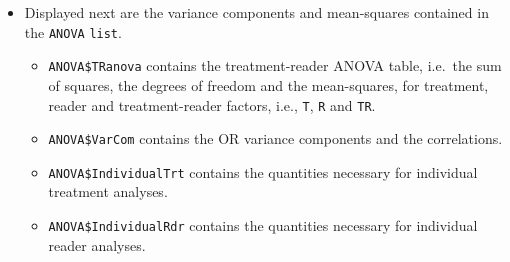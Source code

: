 \documentclass[
]{book}
\newenvironment{Shaded}{\begin{snugshade}}{\end{snugshade}}
\newcommand{\CommentTok}[1]{\textcolor[rgb]{0.56,0.35,0.01}{\textit{#1}}}
\newcommand{\DataTypeTok}[1]{\textcolor[rgb]{0.13,0.29,0.53}{#1}}
\newcommand{\DecValTok}[1]{\textcolor[rgb]{0.00,0.00,0.81}{#1}}
\newcommand{\KeywordTok}[1]{\textcolor[rgb]{0.13,0.29,0.53}{\textbf{#1}}}
\newcommand{\NormalTok}[1]{#1}
\newcommand{\OperatorTok}[1]{\textcolor[rgb]{0.81,0.36,0.00}{\textbf{#1}}}
\newcommand{\StringTok}[1]{\textcolor[rgb]{0.31,0.60,0.02}{#1}}
\providecommand{\tightlist}{%
  \setlength{\itemsep}{0pt}\setlength{\parskip}{0pt}}
\begin{document}
\begin{Shaded}
\end{Shaded}

\begin{itemize}
\tightlist
\item
  Displayed next are the variance components and mean-squares contained in the \texttt{ANOVA} \texttt{list}.

  \begin{itemize}
  \tightlist
  \item
    \texttt{ANOVA\$TRanova} contains the treatment-reader ANOVA table, i.e.~the sum of squares, the degrees of freedom and the mean-squares, for treatment, reader and treatment-reader factors, i.e., \texttt{T}, \texttt{R} and \texttt{TR}.
  \item
    \texttt{ANOVA\$VarCom} contains the OR variance components and the correlations.
  \item
    \texttt{ANOVA\$IndividualTrt} contains the quantities necessary for individual treatment analyses.
  \item
    \texttt{ANOVA\$IndividualRdr} contains the quantities necessary for individual reader analyses.
  \end{itemize}
\end{itemize}
\end{document}
